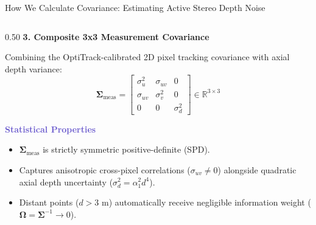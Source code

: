 \documentclass[aspectratio=169, 10pt]{beamer}
\begin{document}
\begin{frame}{How We Calculate Covariance: Estimating Active Stereo Depth Noise}
\begin{columns}[T]
    \begin{column}{0.50\textwidth}
      {\small \textbf{\textcolor{NavyBlue}{3. Composite 3x3 Measurement Covariance}}}
      \vspace{0.1cm}

      Combining the OptiTrack-calibrated 2D pixel tracking covariance with axial depth variance:
      \begin{equation}
        \mathbf{\Sigma}_{\text{meas}} = \begin{bmatrix}
          \sigma_u^2 & \sigma_{uv} & 0 \\
          \sigma_{uv} & \sigma_v^2 & 0 \\
          0 & 0 & \sigma_d^2
        \end{bmatrix} \in \mathbb{R}^{3 \times 3}
      \end{equation}
      \vspace{0.1cm}

      {\small \textbf{\textcolor{SlateBlue}{Statistical Properties}}}\\
      \scriptsize
      \begin{itemize}
        \setlength{\itemsep}{2pt}
        \item $\mathbf{\Sigma}_{\text{meas}}$ is strictly symmetric positive-definite (SPD).
        \item Captures anisotropic cross-pixel correlations ($\sigma_{uv} \ne 0$) alongside quadratic axial depth uncertainty ($\sigma_d^2 = \alpha_1^2 d^4$).
        \item Distant points ($d > 3\text{ m}$) automatically receive negligible information weight ($\mathbf{\Omega} = \mathbf{\Sigma}^{-1} \to 0$).
      \end{itemize}
    \end{column}
  \end{columns}
\end{frame}
\end{document}
